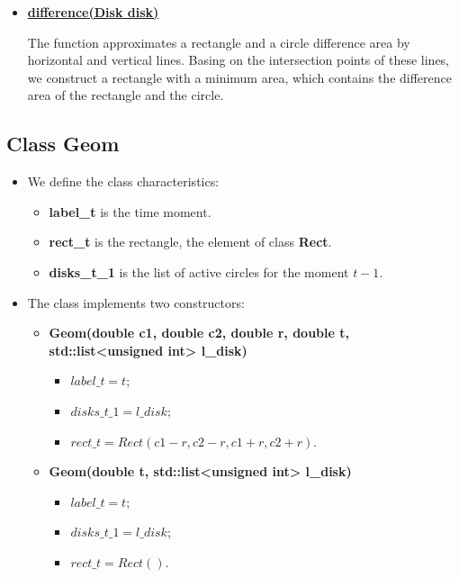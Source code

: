 \documentclass{report}
\begin{document}
\begin{itemize}
\begin{itemize}
			\item \hyperref [Difference]{\bfseries difference(Disk disk)} 
			
			The function approximates a rectangle and a circle difference area by horizontal and vertical lines. Basing on the intersection points of these lines, we construct a rectangle with a minimum area, which contains the difference area of the rectangle and the circle.
		\end{itemize}
	\end{itemize}

	\newpage
		
	\subsection*{Class Geom}
	\label{Geom}
	
	\begin{itemize}
		\item We define the class characteristics: 
		\begin{itemize}
			\item {\bfseries label\_t} is the time moment.
			
			\item {\bfseries rect\_t} is the rectangle, the element of class {\bfseries Rect}.
			
			\item {\bfseries disks\_t\_1} is the list of active circles for the moment $t-1$.
		\end{itemize}
		
		\item The class implements two constructors:
		\begin{itemize}
			\item {\bfseries Geom(double c1, double c2, double r, double t, std::list<unsigned int> l\_disk)}
			\begin{itemize}
				\item $label\_t = t$;
				\item $disks\_t\_1 = l\_disk$;
				\item $rect\_t = Rect(c1-r, c2-r, c1+r, c2+r)$.
			\end{itemize}
			
			\item {\bfseries Geom(double t, std::list<unsigned int> l\_disk)}
			\begin{itemize}
				\item $label\_t = t$;
				\item $disks\_t\_1 = l\_disk$;
				\item $rect\_t = Rect()$.
			\end{itemize}	
		\end{itemize}
		

\end{itemize}
\end{document}
